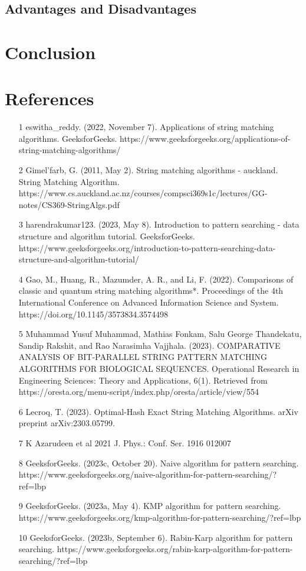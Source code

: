 \documentclass[12pt]{article}
\begin{document}
\subsection{Advantages and Disadvantages}

\section{Conclusion}

\section{References}
\begin{itemize}
	\item [1] eswitha_reddy. (2022, November 7). Applications of string matching algorithms. GeeksforGeeks. https://www.geeksforgeeks.org/applications-of-string-matching-algorithms/ 
	\item [2] Gimel'farb, G. (2011, May 2). String matching algorithms - auckland. String Matching Algorithm. https://www.cs.auckland.ac.nz/courses/compsci369s1c/lectures/GG-notes/CS369-StringAlgs.pdf 
	\item [3] harendrakumar123. (2023, May 8). Introduction to pattern searching - data structure and algorithm tutorial. GeeksforGeeks. https://www.geeksforgeeks.org/introduction-to-pattern-searching-data-structure-and-algorithm-tutorial/ 
	\item [4] Gao, M., Huang, R., Mazumder, A. R., and Li, F. (2022). Comparisons of classic and quantum string matching algorithms*. Proceedings of the 4th International Conference on Advanced Information Science and System. https://doi.org/10.1145/3573834.3574498 
	\item [5] Muhammad Yusuf Muhammad, Mathias Fonkam, Salu George Thandekatu, Sandip Rakshit, and Rao Narasimha Vajjhala. (2023). COMPARATIVE ANALYSIS OF BIT-PARALLEL STRING PATTERN MATCHING ALGORITHMS FOR BIOLOGICAL SEQUENCES. Operational Research in Engineering Sciences: Theory and Applications, 6(1). Retrieved from https://oresta.org/menu-script/index.php/oresta/article/view/554 
	\item [6] Lecroq, T. (2023). Optimal-Hash Exact String Matching Algorithms. arXiv preprint arXiv:2303.05799. 
	\item [7] K Azarudeen et al 2021 J. Phys.: Conf. Ser. 1916 012007 
	\item [8] GeeksforGeeks. (2023c, October 20). Naive algorithm for pattern searching. https://www.geeksforgeeks.org/naive-algorithm-for-pattern-searching/?ref=lbp 
	\item [9] GeeksforGeeks. (2023a, May 4). KMP algorithm for pattern searching. https://www.geeksforgeeks.org/kmp-algorithm-for-pattern-searching/?ref=lbp 
	\item [10] GeeksforGeeks. (2023b, September 6). Rabin-Karp algorithm for pattern searching. https://www.geeksforgeeks.org/rabin-karp-algorithm-for-pattern-searching/?ref=lbp 
\end{itemize}
\end{document}
